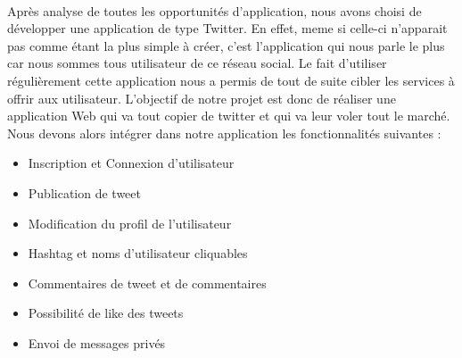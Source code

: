 \documentclass[a4paper, 12pt]{article}
\begin{document}
	\paragraph{}
 Après analyse de toutes les opportunités d'application, nous avons choisi de développer une application de type Twitter. En effet, meme si celle-ci n'apparait pas comme étant la plus simple à créer, c'est l'application qui nous parle le plus car nous sommes tous utilisateur de ce réseau social.
	    Le fait d'utiliser régulièrement cette application nous a permis de tout de suite cibler les services à offrir aux utilisateur.
		L'objectif de notre projet est donc de réaliser une application Web qui va tout copier de twitter et qui va leur voler tout le marché. Nous devons alors intégrer dans notre application les fonctionnalités suivantes : 
\begin{itemize}
\item Inscription et Connexion d'utilisateur
\item Publication de tweet 
\item Modification du profil de l'utilisateur
\item Hashtag et noms d'utilisateur cliquables
\item Commentaires de tweet et de commentaires
\item Possibilité de like des tweets
\item Envoi de messages privés
\end{itemize}





\newpage
\end{document}
